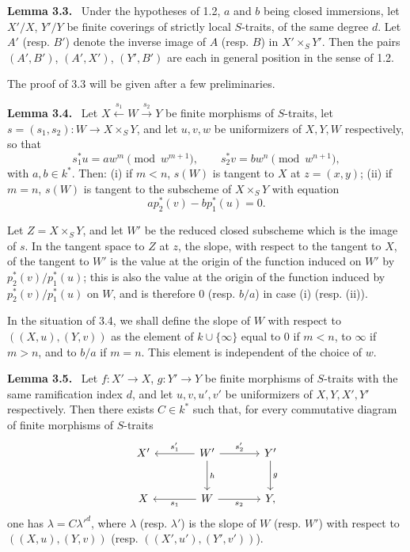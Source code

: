 \documentclass[11pt]{article}
\newenvironment{statement}[1]{\par\medskip\noindent\textbf{#1.}\ }{\par\medskip}
\begin{document}
\begin{statement}{Lemma 3.3}
Under the hypotheses of 1.2, $a$ and $b$ being closed immersions, let $X'/X$, $Y'/Y$ be finite coverings of strictly local $S$-traits, of the same degree $d$. Let $A'$ (resp. $B'$) denote the inverse image of $A$ (resp. $B$) in $X'\times_S Y'$. Then the pairs $(A',B')$, $(A',X')$, $(Y',B')$ are each in general position in the sense of 1.2.
\end{statement}

The proof of 3.3 will be given after a few preliminaries.

\begin{statement}{Lemma 3.4}
Let $X\xleftarrow{s_1}W\xrightarrow{s_2}Y$ be finite morphisms of $S$-traits, let $s=(s_1,s_2):W\to X\times_SY$, and let $u,v,w$ be uniformizers of $X,Y,W$ respectively, so that
\[
s_1^*u=aw^m\pmod {w^{m+1}},\qquad
s_2^*v=bw^n\pmod {w^{n+1}},
\]
with $a,b\in k^*$. Then: (i) if $m<n$, $s(W)$ is tangent to $X$ at $z=(x,y)$; (ii) if $m=n$, $s(W)$ is tangent to the subscheme of $X\times_SY$ with equation
\[
ap_2^*(v)-bp_1^*(u)=0.
\]
\end{statement}

Let $Z=X\times_SY$, and let $W'$ be the reduced closed subscheme which is the image of $s$. In the tangent space to $Z$ at $z$, the slope, with respect to the tangent to $X$, of the tangent to $W'$ is the value at the origin of the function induced on $W'$ by $p_2^*(v)/p_1^*(u)$; this is also the value at the origin of the function induced by $p_2^*(v)/p_1^*(u)$ on $W$, and is therefore $0$ (resp. $b/a$) in case (i) (resp. (ii)).

In the situation of 3.4, we shall define the slope of $W$ with respect to $((X,u),(Y,v))$ as the element of $k\cup\{\infty\}$ equal to $0$ if $m<n$, to $\infty$ if $m>n$, and to $b/a$ if $m=n$. This element is independent of the choice of $w$.

\begin{statement}{Lemma 3.5}
Let $f:X'\to X$, $g:Y'\to Y$ be finite morphisms of $S$-traits with the same ramification index $d$, and let $u,v,u',v'$ be uniformizers of $X,Y,X',Y'$ respectively. Then there exists $C\in k^*$ such that, for every commutative diagram of finite morphisms of $S$-traits
\[
\begin{tikzcd}[column sep=large,row sep=large]
X' & W' \arrow[l,"s'_1"'] \arrow[r,"s'_2"] \arrow[d,"h"] & Y' \arrow[d,"g"]\\
X & W \arrow[l,"s_1"] \arrow[r,"s_2"'] & Y ,
\end{tikzcd}
\]
one has $\lambda=C{\lambda'}^d$, where $\lambda$ (resp. $\lambda'$) is the slope of $W$ (resp. $W'$) with respect to $((X,u),(Y,v))$ (resp. $((X',u'),(Y',v'))$).
\end{statement}
\end{document}
